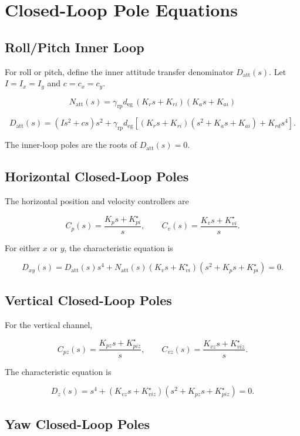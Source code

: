 \documentclass[11pt]{article}
\newcommand{\degc}{d_{\mathrm{eg}}}
\newcommand{\gammar}{\gamma_{\mathrm{rp}}}
\begin{document}
\section{Closed-Loop Pole Equations}

\subsection{Roll/Pitch Inner Loop}

For roll or pitch, define the inner attitude transfer denominator
\(D_{\mathrm{att}}(s)\). Let \(I=I_x=I_y\) and \(c=c_x=c_y\).

\[
N_{\mathrm{att}}(s)
=
\gammar\degc\,(K_rs+K_{ri})(K_as+K_{ai})
\]

\[
\boxed{
D_{\mathrm{att}}(s)
=
(Is^2+cs)s^2
+\gammar\degc
\left[
(K_rs+K_{ri})(s^2+K_as+K_{ai})
+K_{rd}s^4
\right].
}
\]

The inner-loop poles are the roots of \(D_{\mathrm{att}}(s)=0\).

\subsection{Horizontal Closed-Loop Poles}

The horizontal position and velocity controllers are

\[
C_p(s)=\frac{K_ps+K_{pi}^{\star}}{s},
\qquad
C_v(s)=\frac{K_vs+K_{vi}^{\star}}{s}.
\]

For either \(x\) or \(y\), the characteristic equation is

\[
\boxed{
D_{xy}(s)
=
D_{\mathrm{att}}(s)s^4
+N_{\mathrm{att}}(s)(K_vs+K_{vi}^{\star})
(s^2+K_ps+K_{pi}^{\star})=0.
}
\]

\subsection{Vertical Closed-Loop Poles}

For the vertical channel,

\[
C_{pz}(s)=\frac{K_{pz}s+K_{piz}^{\star}}{s},
\qquad
C_{vz}(s)=\frac{K_{vz}s+K_{viz}^{\star}}{s}.
\]

The characteristic equation is

\[
\boxed{
D_z(s)
=
s^4
+(K_{vz}s+K_{viz}^{\star})
(s^2+K_{pz}s+K_{piz}^{\star})=0.
}
\]


\subsection{Yaw Closed-Loop Poles}
\end{document}
